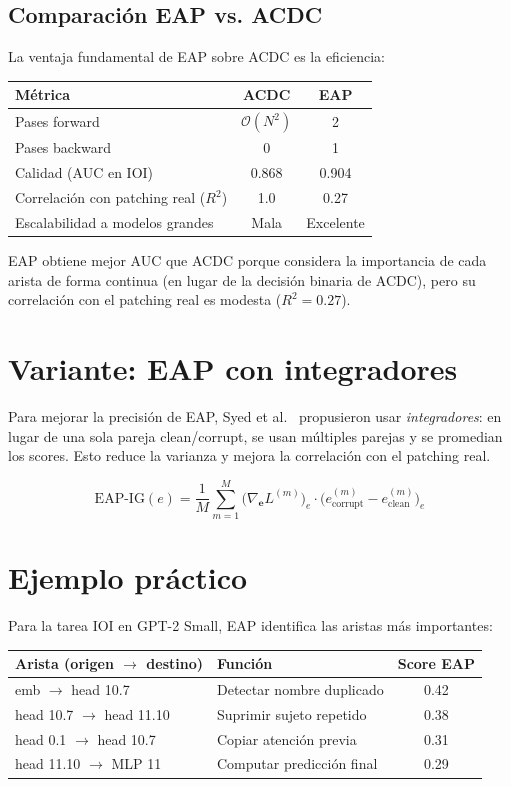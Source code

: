 \documentclass[11pt,a4paper]{report}
\theoremstyle{definition}
\begin{document}
\subsection{Comparación EAP vs. ACDC}

La ventaja fundamental de EAP sobre ACDC es la eficiencia:

\begin{center}
\begin{tabular}{lcc}
\toprule
\textbf{Métrica} & \textbf{ACDC} & \textbf{EAP} \\
\midrule
Pases forward & $\mathcal{O}(N^2)$ & 2 \\
Pases backward & 0 & 1 \\
Calidad (AUC en IOI) & 0.868 & 0.904 \\
Correlación con patching real ($R^2$) & 1.0 & 0.27 \\
Escalabilidad a modelos grandes & Mala & Excelente \\
\bottomrule
\end{tabular}
\end{center}

EAP obtiene mejor AUC que ACDC porque considera la importancia de cada arista de forma continua (en lugar de la decisión binaria de ACDC), pero su correlación con el patching real es modesta ($R^2 = 0.27$).

\section{Variante: EAP con integradores}

Para mejorar la precisión de EAP, Syed et al.~\cite{syed2023eap} propusieron usar \emph{integradores}: en lugar de una sola pareja clean/corrupt, se usan múltiples parejas y se promedian los scores. Esto reduce la varianza y mejora la correlación con el patching real.

\[
\text{EAP-IG}(e) = \frac{1}{M} \sum_{m=1}^M \big(\nabla_{\mathbf{e}} L^{(m)}\big)_e \cdot \big(e_{\text{corrupt}}^{(m)} - e_{\text{clean}}^{(m)}\big)_e
\]

\section{Ejemplo práctico}

Para la tarea IOI en GPT-2 Small, EAP identifica las aristas más importantes:

\begin{center}
\begin{tabular}{llc}
\toprule
\textbf{Arista (origen $\to$ destino)} & \textbf{Función} & \textbf{Score EAP} \\
\midrule
emb $\to$ head 10.7 & Detectar nombre duplicado & 0.42 \\
head 10.7 $\to$ head 11.10 & Suprimir sujeto repetido & 0.38 \\
head 0.1 $\to$ head 10.7 & Copiar atención previa & 0.31 \\
head 11.10 $\to$ MLP 11 & Computar predicción final & 0.29 \\
\bottomrule
\end{tabular}
\end{center}
\end{document}
